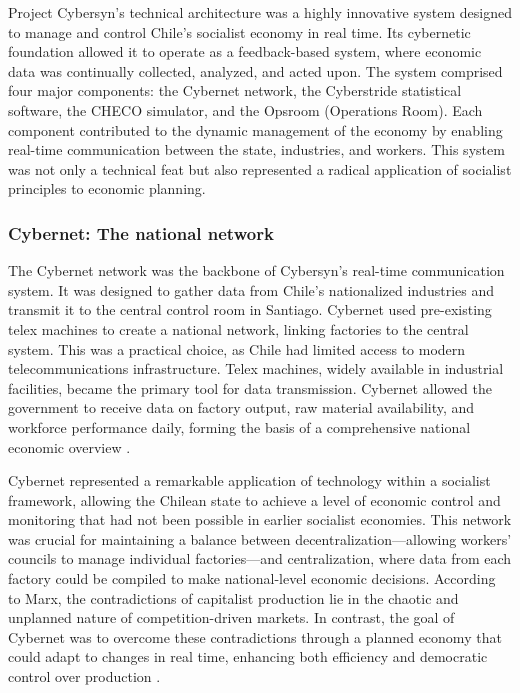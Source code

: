 \begin{refsection}
Project Cybersyn's technical architecture was a highly innovative system designed to manage and control Chile's socialist economy in real time. Its cybernetic foundation allowed it to operate as a feedback-based system, where economic data was continually collected, analyzed, and acted upon. The system comprised four major components: the Cybernet network, the Cyberstride statistical software, the CHECO simulator, and the Opsroom (Operations Room). Each component contributed to the dynamic management of the economy by enabling real-time communication between the state, industries, and workers. This system was not only a technical feat but also represented a radical application of socialist principles to economic planning.

\subsubsection{Cybernet: The national network}

The Cybernet network was the backbone of Cybersyn's real-time communication system. It was designed to gather data from Chile's nationalized industries and transmit it to the central control room in Santiago. Cybernet used pre-existing telex machines to create a national network, linking factories to the central system. This was a practical choice, as Chile had limited access to modern telecommunications infrastructure. Telex machines, widely available in industrial facilities, became the primary tool for data transmission. Cybernet allowed the government to receive data on factory output, raw material availability, and workforce performance daily, forming the basis of a comprehensive national economic overview \cite[pp.~89-93]{medina2011}.

Cybernet represented a remarkable application of technology within a socialist framework, allowing the Chilean state to achieve a level of economic control and monitoring that had not been possible in earlier socialist economies. This network was crucial for maintaining a balance between decentralization—allowing workers' councils to manage individual factories—and centralization, where data from each factory could be compiled to make national-level economic decisions. According to Marx, the contradictions of capitalist production lie in the chaotic and unplanned nature of competition-driven markets. In contrast, the goal of Cybernet was to overcome these contradictions through a planned economy that could adapt to changes in real time, enhancing both efficiency and democratic control over production \cite[pp.~125-129]{beer1994}.


\end{refsection}
